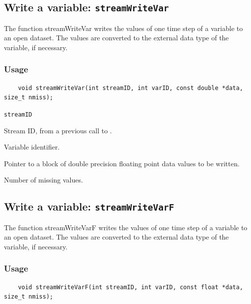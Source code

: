 

\subsection{Write a variable: \texttt{streamWriteVar}}
\label{streamWriteVar}

The function streamWriteVar writes the values of one time step of a variable to an open dataset.
The values are converted to the external data type of the variable, if necessary.
\subsubsection*{Usage}

\begin{verbatim}
    void streamWriteVar(int streamID, int varID, const double *data, size_t nmiss);
\end{verbatim}

\hspace*{4mm}\begin{minipage}[]{15cm}
\begin{deflist}{\texttt{streamID}\ }
\item[\texttt{streamID}]
Stream ID, from a previous call to {}.
\item[\texttt{varID}]
Variable identifier.
\item[\texttt{data}]
Pointer to a block of double precision floating point data values to be written.
\item[\texttt{nmiss}]
Number of missing values.

\end{deflist}
\end{minipage}


\subsection{Write a variable: \texttt{streamWriteVarF}}
\label{streamWriteVarF}

The function streamWriteVarF writes the values of one time step of a variable to an open dataset.
The values are converted to the external data type of the variable, if necessary.
\subsubsection*{Usage}

\begin{verbatim}
    void streamWriteVarF(int streamID, int varID, const float *data, size_t nmiss);
\end{verbatim}

